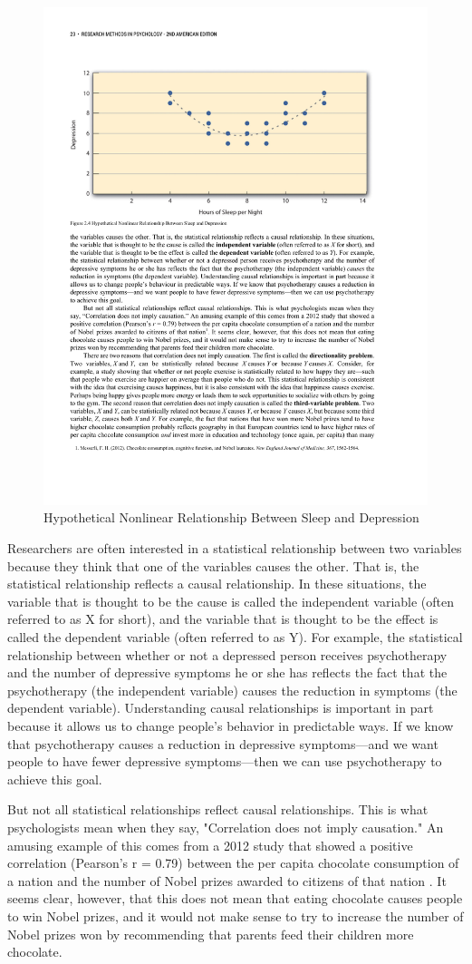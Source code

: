 \begin{figure}
      \includegraphics[width=.75\linewidth]{figures/C2F5Ucurve.pdf}
      \caption{Hypothetical Nonlinear Relationship Between Sleep and Depression}
      \label{fig:Nonlinear}
\end{figure}
Researchers are often interested in a statistical relationship between two variables because they think that one of the variables causes the other. That is, the statistical relationship reflects a causal relationship. In these situations, the variable that is thought to be the cause is called the independent variable (often referred to as X for short), and the variable that is thought to be the effect is called the dependent variable (often referred to as Y). For example, the statistical relationship between whether or not a depressed person receives psychotherapy and the number of depressive symptoms he or she has reflects the fact that the psychotherapy (the independent variable) causes the reduction in symptoms (the dependent variable). Understanding causal relationships is important in part because it allows us to change people's behavior in predictable ways. If we know that psychotherapy causes a reduction in depressive symptoms---and we want people to have fewer depressive symptoms---then we can use psychotherapy to achieve this goal.

But not all statistical relationships reflect causal relationships. This is what psychologists mean when they say, "Correlation does not imply causation." An amusing example of this comes from a 2012 study that showed a positive correlation (Pearson's r = 0.79) between the per capita chocolate consumption of a nation and the number of Nobel prizes awarded to citizens of that nation \citep{messerli_chocolate_2012}. It seems clear, however, that this does not mean that eating chocolate causes people to win Nobel prizes, and it would not make sense to try to increase the number of Nobel prizes won by recommending that parents feed their children more chocolate.

